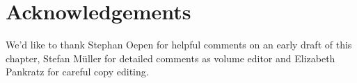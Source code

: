 \documentclass[output=paper
                ,modfonts
                ,nonflat
	        ,collection
	        ,collectionchapter
	        ,collectiontoclongg
 	        ,biblatex
                ,babelshorthands
                ,newtxmath
                ,draftmode
                ,colorlinks, citecolor=brown
]{./langsci/langscibook}
\begin{document}


\section*{Acknowledgements}

We'd like to thank Stephan Oepen for helpful comments on an early
draft of this chapter, Stefan M\"uller for detailed comments as
volume editor and Elizabeth Pankratz for careful copy editing.

{\sloppy
\printbibliography[heading=subbibliography,notkeyword=this] 
}
\end{document}
